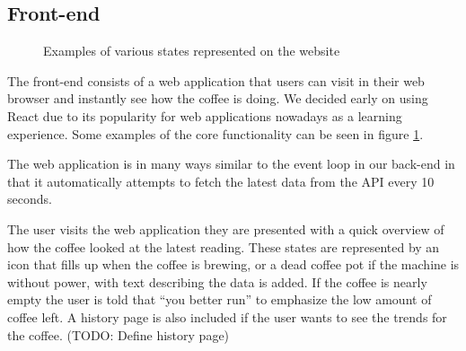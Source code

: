 \documentclass[12pt,a4paper,oneside,article]{memoir}
\numberwithin{equation}{chapter}
\begin{document}
\subsection{Front-end}\label{sec:front-end}
\begin{figure}[ht]
  \centerfloat{}
  \caption{Examples of various states represented on the website}\label{fig:website}
\end{figure}
The front-end consists of a web application that users can visit in their web 
browser and instantly see how the coffee is doing. We decided early on using 
React due to its popularity for web applications nowadays as a learning 
experience. Some examples of the core functionality can be seen in figure 
\ref{fig:website}.

The web application is in many ways similar to the event loop in our back-end in
that it automatically attempts to fetch the latest data from the API every 10
seconds.

The user visits the web application they are presented with a quick
overview of how the coffee looked at the latest reading. These states are
represented by an icon that fills up when the coffee is brewing, or a dead
coffee pot if the machine is without power, with text describing the data is 
added. If the coffee is nearly empty the user is told that ``you better run'' 
to emphasize the low amount of coffee left. A history page is also included if 
the user wants to see the trends for the coffee. (TODO: Define history page)
\end{document}
